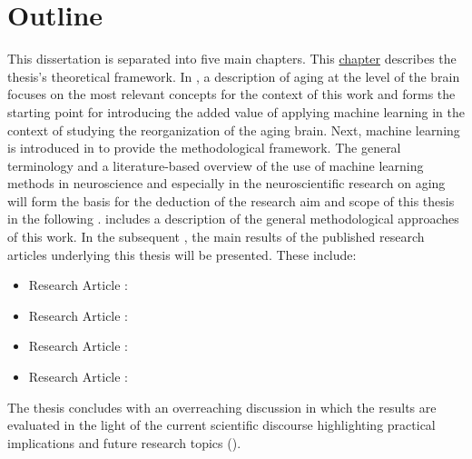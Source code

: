 \section{Outline}
This dissertation is separated into five main chapters. This \hyperref[chap:intro]{chapter} describes the thesis's theoretical framework. In , a description of aging at the level of the brain focuses on the most relevant concepts for the context of this work and forms the starting point for introducing the added value of applying machine learning in the context of studying the reorganization of the aging brain. Next, machine learning is introduced in  to provide the methodological framework. The general terminology and a literature-based overview of the use of machine learning methods in neuroscience and especially in the neuroscientific research on aging will form the basis for the deduction of the research aim and scope of this thesis in the following .  includes a description of the general methodological approaches of this work. In the subsequent , the main results of the published research articles underlying this thesis will be presented. These include:

\begin{itemize}
\item Research Article :\\ \hyperref[pub:paperI]{}
\newpage
\item Research Article :\\ \hyperref[pub:paperI]{}
\item Research Article :\\ \hyperref[pub:paperI]{}
\item Research Article :\\ \hyperref[pub:paperI]{}
\end{itemize}

\noindent The thesis concludes with an overreaching discussion in which the results are evaluated in the light of the current scientific discourse highlighting practical implications and future research topics (). 
